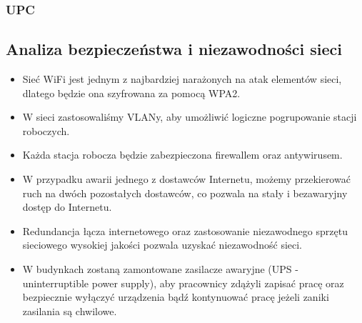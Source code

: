 \documentclass[a4paper,12pt]{extarticle}  %
\begin{document}
\subsubsection{UPC}
\begin{figure}[H]
	\centering
\end{figure}
\subsection{Analiza bezpieczeństwa i niezawodności sieci}
\begin{itemize}
	\item Sieć WiFi jest jednym z najbardziej narażonych na atak elementów sieci, dlatego będzie ona szyfrowana za pomocą WPA2.
	\item W sieci zastosowaliśmy VLANy, aby umożliwić logiczne pogrupowanie stacji roboczych.
	\item Każda stacja robocza będzie zabezpieczona firewallem oraz antywirusem.
	\item W przypadku awarii jednego z dostawców Internetu, możemy przekierować ruch na dwóch pozostałych dostawców, co pozwala na stały i bezawaryjny dostęp do Internetu.
	\item Redundancja łącza internetowego oraz zastosowanie niezawodnego sprzętu sieciowego wysokiej jakości pozwala uzyskać niezawodność sieci.
	\item W budynkach zostaną zamontowane zasilacze awaryjne (UPS - uninterruptible power supply), aby pracownicy zdążyli zapisać pracę oraz bezpiecznie wyłączyć
	      urządzenia bądź kontynuować pracę jeżeli zaniki zasilania są chwilowe.
\end{itemize}
\end{document}
